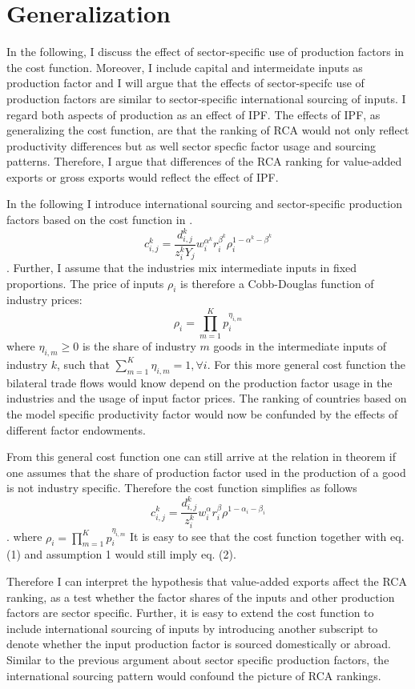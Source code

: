 \section{Generalization}
In the following, I discuss the effect of sector-specific use of production factors in the cost function. Moreover, I include capital and intermeidate inputs as production factor and I will argue that the effects of sector-specifc use of production factors are similar to sector-specific international sourcing of inputs. I regard both aspects of production as an effect of IPF. The effects of IPF, as generalizing the cost function, are that the ranking of RCA would not only reflect productivity differences but as well sector specfic factor usage and sourcing patterns.  Therefore, I argue  that differences of the RCA ranking for value-added exports or gross exports would reflect the effect of IPF. \par
In the following I introduce international sourcing and sector-specific production factors based on the cost function in \textcite{Shikher}.  \[ c^k_{i,j}=\frac{d^k_{i,j}}{z_{i}^k Y_j} w^{\alpha^k}_i r^{\beta^k}_i \rho^{1-\alpha^k-\beta^k}_{i} \]. Further, I assume that the industries mix intermediate inputs in fixed proportions. The price of inputs $\rho_i$ is therefore a Cobb-Douglas function of industry prices:
\[\rho_{i}= \prod\limits_{m=1}^{K}  p^{\eta_{i,m}}_{i}  \] where $\eta_{i,m} \geq 0$ is the share of industry $m$ goods in the intermediate inputs of industry $k$, such that $\sum_{m=1}^K \eta_{i,m}=1, \forall i$.  For this more general cost function the bilateral trade flows would know depend on the production factor usage in the industries and the usage of input factor prices. The ranking of countries based on the model specific productivity factor would now be confunded by the effects of different factor endowments.  
\par From this general cost function one can still arrive at the relation in theorem if one assumes that the share of production factor used in the production of a good  is not industry specific. Therefore the cost function simplifies as follows  \[ c^k_{i,j}=\frac{d^k_{i,j}}{z_{i}^k } w^{\alpha}_i r^{\beta}_i \rho^{1-\alpha_{i}-\beta_{i}} \]. where
$\rho_{i}= \prod\limits_{m=1}^{K}  p^{\eta_{i,m}}_{i} $ It is easy to see that the cost function together with eq. (1) and assumption 1 would still imply eq. (2). \par Therefore I can interpret the hypothesis that value-added exports affect the  RCA ranking, as a test whether the factor shares of the inputs and other production factors are sector specific. Further, it is easy to extend the cost function to include international sourcing of inputs by introducing another subscript to denote whether the input production factor is sourced domestically or abroad. Similar to the previous argument about sector specific production factors, the international sourcing pattern would confound the picture of RCA rankings.  
